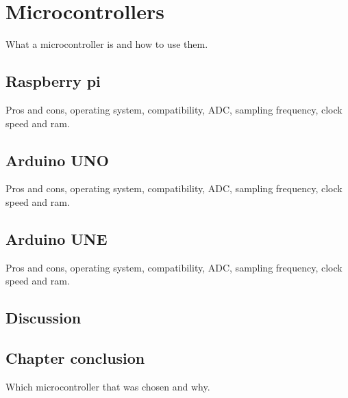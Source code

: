 \chapter{Microcontrollers}
\label{chap:microcontrollers}
What a microcontroller is and how to use them.

\section{Raspberry pi}
Pros and cons, operating system, compatibility, ADC, sampling frequency, clock speed and ram.

\section{Arduino UNO}
Pros and cons, operating system, compatibility, ADC, sampling frequency, clock speed and ram.

\section{Arduino UNE}
Pros and cons, operating system, compatibility, ADC, sampling frequency, clock speed and ram.

\section{Discussion}

\section{Chapter conclusion}
Which microcontroller that was chosen and why.

